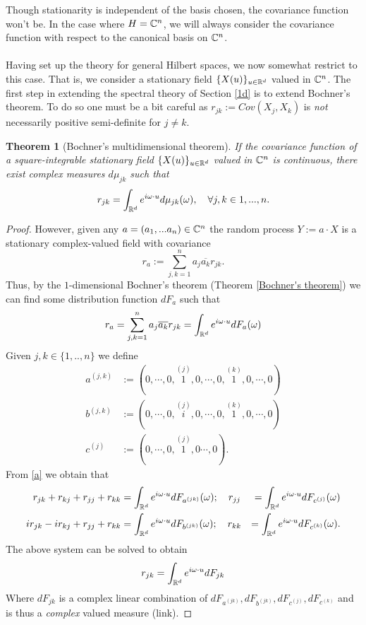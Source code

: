 \documentclass[12pt]{article}
\newtheorem{theorem}{Theorem}
\begin{document}
Though stationarity is independent of the basis chosen, the covariance function won't be. In the case where  $H=\mathbb{C}^n$, we will always consider the covariance function with respect to the canonical basis on $\mathbb{C}^n$.
\\
\\
Having set up the theory for general Hilbert spaces, we now somewhat restrict to this case. That is, we consider a stationary field $\{X(u)\}_{u\in{\mathbb R}^d}$ valued in $\mathbb{C}^n$. The first step in extending the spectral theory of Section \ref{1d} is to extend Bochner's theorem. To do so one must be a bit careful as $r_{ j k }:=Cov(X_j,X_k)$ is \emph{not} necessarily positive semi-definite for $j\neq k$.
\begin{theorem}[Bochner's multidimensional theorem]\label{bochner 3d}
	If the covariance function of a square-integrable stationary field $\{X(u)\}_{u\in{\mathbb R}^d}$ valued in $\mathbb{C}^n$ is continuous, there exist complex measures $d\mu_{jk}$ such that
	\begin{equation*}
		r_{jk}=\int_{{\mathbb R}^d} e^{i\omega \cdot u} d\mu _{j k}(\omega),\quad \forall j,k\in{1,...,n}.
	\end{equation*}
\end{theorem}
\begin{proof}
	However, given any $a=(a_1,...a_n)\in\mathbb{C}^n$ the random process
	$Y:=a\cdot X$ is a stationary complex-valued field with covariance
	\begin{equation*}
		r_a:=\sum_{j,k=1}^n a_j\overline{a_k}r_{jk}.
	\end{equation*}
	Thus, by the $1$-dimensional Bochner's theorem (Theorem \ref{Bochner's theorem}) we can find some distribution function $dF_a$ such that
	\begin{equation}\label{a}
		r_a= \sum_{j,k=1}^{n} a_j \overline{a_k}r_{jk}=\int_{{\mathbb R}^d}e^{i\omega\cdot u}dF_a(\omega)
	\end{equation}
	Given $j, k\in\{1,..,n\}$ we define
	\begin{align*}
		a^{(j,k)} & :=(0,\cdots,0,\overset{(j)}{1},0,\cdots,0,\overset{(k)}{1},0,\cdots,0) \\
		b^{(j,k)} & :=(0,\cdots,0,\overset{(j)}{i},0,\cdots,0,\overset{(k)}{1},0,\cdots,0) \\
		c^{(j)}   & :=(0,\cdots,0,\overset{(j)}{1},0\cdots,0).
	\end{align*}
	From \eqref{a} we obtain that
	\begin{align*}
		r_{jk}+r_{kj}+r_{jj}+r_{kk}   & =\int_{{\mathbb R}^d}e^{i\omega\cdot u}dF_{a^{(jk)}}(\omega);\quad r_{jj} & =\int_{{\mathbb R}^d}e^{i\omega\cdot u}dF_{c^{(j)}}(\omega)  \\
		ir_{jk}-ir_{kj}+r_{jj}+r_{kk} & =\int_{{\mathbb R}^d}e^{i\omega\cdot u}dF_{b^{(jk)}}(\omega);\quad r_{kk} & =\int_{{\mathbb R}^d}e^{i\omega\cdot u}dF_{c^{(k)}}(\omega).
	\end{align*}
	The above system can be solved to obtain
	\begin{equation*}
		r_{jk}=\int_{{\mathbb R}^d}e^{i\omega\cdot u}dF_{jk}
	\end{equation*}
	Where $dF_{jk}$ is a complex linear combination of $dF_{a^{(jk)}},dF_{b^{(jk)}}, dF_{c^(j)},dF_{c^{(k)}}$ and is thus a \emph{complex} valued measure (link).
\end{proof}
\end{document}
